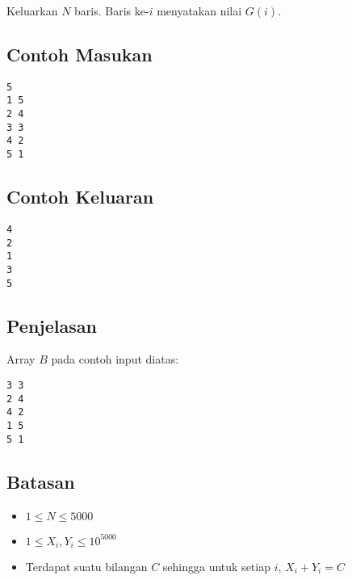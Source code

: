 \documentclass{article}
\begin{document}
\par\noindent Keluarkan $N$ baris. Baris ke-$i$ menyatakan nilai $G(i)$.

\subsection*{Contoh Masukan}

\begin{lstlisting}
5
1 5
2 4
3 3
4 2
5 1
\end{lstlisting}

\subsection*{Contoh Keluaran}

\begin{lstlisting}
4
2
1
3
5
\end{lstlisting}

\subsection*{Penjelasan}

\par\noindent Array $B$ pada contoh input diatas:
\begin{lstlisting}
3 3
2 4
4 2
1 5
5 1
\end{lstlisting}

\subsection*{Batasan}

\begin{itemize}
	\item $1 \leq N \leq 5000$
	\item $1 \leq X_i, Y_i \leq 10^{5000}$
	\item Terdapat suatu bilangan $C$ sehingga untuk setiap $i$, $X_i + Y_i = C$
\end{itemize}
\end{document}

